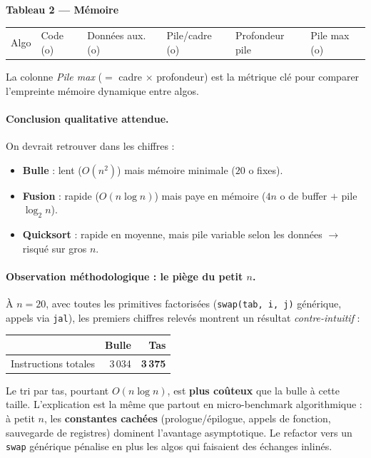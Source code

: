 \documentclass[11pt,a4paper]{article}
\begin{document}
\textbf{Tableau 2 --- Mémoire}
\begin{center}
\begin{tabular}{llllll}
Algo & Code (o) & Données aux. (o) & Pile/cadre (o) & Profondeur pile & Pile max (o) \\
\end{tabular}
\end{center}

La colonne \emph{Pile max} ($=$ cadre $\times$ profondeur) est la métrique clé pour comparer l'empreinte mémoire dynamique entre algos.

\paragraph{Conclusion qualitative attendue.}

On devrait retrouver dans les chiffres :
\begin{itemize}
    \item \textbf{Bulle} : lent ($O(n^2)$) mais mémoire minimale ($20$ o fixes).
    \item \textbf{Fusion} : rapide ($O(n \log n)$) mais paye en mémoire ($4n$ o de buffer $+$ pile $\log_2 n$).
    \item \textbf{Quicksort} : rapide en moyenne, mais pile variable selon les données $\rightarrow$ risqué sur gros $n$.
\end{itemize}

\paragraph{Observation méthodologique : le piège du petit $n$.}

À $n = 20$, avec toutes les primitives factorisées (\texttt{swap(tab, i, j)}
générique, appels via \texttt{jal}), les premiers chiffres relevés montrent
un résultat \emph{contre-intuitif} :

\begin{center}
\begin{tabular}{lrr}
\toprule
 & \textbf{Bulle} & \textbf{Tas} \\
\midrule
Instructions totales & 3\,034 & \textbf{3\,375} \\
\bottomrule
\end{tabular}
\end{center}

Le tri par tas, pourtant $O(n \log n)$, est \textbf{plus coûteux} que la
bulle à cette taille. L'explication est la même que partout en
micro-benchmark algorithmique : à petit $n$, les \textbf{constantes
cachées} (prologue/épilogue, appels de fonction, sauvegarde de registres)
dominent l'avantage asymptotique. Le refactor vers un \texttt{swap}
générique pénalise en plus les algos qui faisaient des échanges inlinés.
\end{document}
